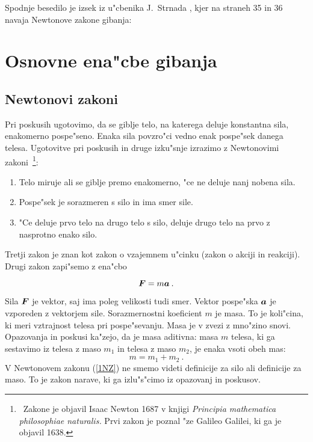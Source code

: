 Spodnje besedilo je izsek iz u"cbenika J.~Strnada \cite{St}, 
kjer na straneh 35 in 36 navaja Newtonove zakone gibanja:

\section{Osnovne ena"cbe gibanja}

\subsection{Newtonovi zakoni}

Pri poskusih ugotovimo, da se giblje telo, na katerega deluje 
konstantna sila, enakomerno pospe"seno. Enaka sila povzro"ci 
vedno enak pospe"sek danega telesa.  Ugotovitve pri poskusih 
in druge izku"snje izrazimo z Newtonovimi zakoni~\footnote{~Zakone 
je objavil Isaac Newton 1687 v knjigi {\it Principia mathematica 
philosophiae naturalis.}  Prvi zakon je poznal "ze Galileo Galilei, 
ki ga je objavil 1638.}:

\begin{enumerate}
\item{Telo miruje ali se giblje premo enakomerno, "ce ne deluje nanj 
nobena sila.}
\item{Pospe"sek je sorazmeren s silo in ima smer sile.}
\item{"Ce deluje prvo telo na drugo telo s silo, deluje drugo telo 
na prvo z nasprotno enako silo.}
\end{enumerate}

Tretji zakon je znan kot zakon o vzajemnem u"cinku (zakon o akciji 
in reakciji). Drugi zakon zapi"semo z ena"cbo

\begin{equation}
{\hbox{\boldmath{$F$}}} = m {\hbox{\boldmath{$a$}}} \> .
\label{1NZ}
\end{equation}

Sila ${\hbox{\boldmath{$F$}}}$ je vektor, saj ima poleg velikosti tudi smer. 
Vektor pospe"ska ${\hbox{\boldmath{$a$}}}$ je vzporeden z vektorjem sile. 
Sorazmernostni koeficient  $m$ je masa.  To je koli"cina, 
ki meri vztrajnost telesa pri pospe"sevanju. Masa je v zvezi 
z mno"zino snovi.  Opazovanja in poskusi ka"zejo, da je masa aditivna: 
masa $m$ telesa, ki ga sestavimo iz telesa z maso $m_1$ in telesa 
z maso $m_2$, je enaka vsoti obeh mas:
$$
m = m_1 + m_2 \>.
$$
V Newtonovem zakonu (\ref{1NZ}) ne smemo videti definicije 
za silo ali definicije za maso. To je zakon narave, ki ga 
izlu"s"cimo iz opazovanj in poskusov.

%

